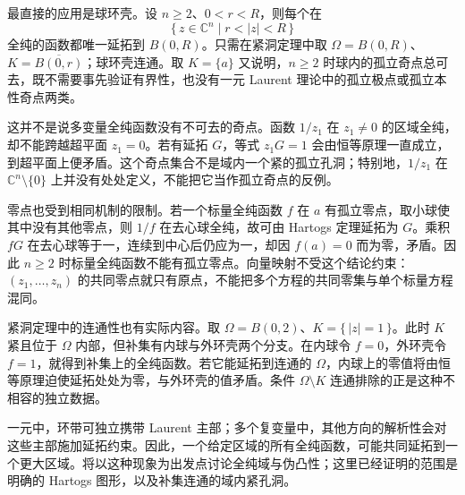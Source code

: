 最直接的应用是球环壳。设 \(n\ge2\)、\(0<r<R\)，则每个在
\[
 \{\,z\in\mathbb C^n\mid r<|z|<R\,\}
\]
全纯的函数都唯一延拓到 \(B(0,R)\)。只需在紧洞定理中取 \(\Omega=B(0,R)\)、\(K=\overline{B(0,r)}\)；球环壳连通。取 \(K=\{a\}\) 又说明，\(n\ge2\) 时球内的孤立奇点总可去，既不需要事先验证有界性，也没有一元 Laurent 理论中的孤立极点或孤立本性奇点两类。

\ProseParagraphBreak
这并不是说多变量全纯函数没有不可去的奇点。函数 \(1/z_1\) 在 \(z_1\ne0\) 的区域全纯，却不能跨越超平面 \(z_1=0\)。若有延拓 \(G\)，等式 \(z_1G=1\) 会由恒等原理一直成立，到超平面上便矛盾。这个奇点集合不是域内一个紧的孤立孔洞；特别地，\(1/z_1\) 在 \(\mathbb C^n\setminus\{0\}\) 上并没有处处定义，不能把它当作孤立奇点的反例。

\ProseParagraphBreak
零点也受到相同机制的限制。若一个标量全纯函数 \(f\) 在 \(a\) 有孤立零点，取小球使其中没有其他零点，则 \(1/f\) 在去心球全纯，故可由 Hartogs 定理延拓为 \(G\)。乘积 \(fG\) 在去心球等于一，连续到中心后仍应为一，却因 \(f(a)=0\) 而为零，矛盾。因此 \(n\ge2\) 时标量全纯函数不能有孤立零点。向量映射不受这个结论约束：\((z_1,\ldots,z_n)\) 的共同零点就只有原点，不能把多个方程的共同零集与单个标量方程混同。

\ProseParagraphBreak
紧洞定理中的连通性也有实际内容。取 \(\Omega=B(0,2)\)、\(K=\{\,|z|=1\,\}\)。此时 \(K\) 紧且位于 \(\Omega\) 内部，但补集有内球与外环壳两个分支。在内球令 \(f=0\)，外环壳令 \(f=1\)，就得到补集上的全纯函数。若它能延拓到连通的 \(\Omega\)，内球上的零值将由恒等原理迫使延拓处处为零，与外环壳的值矛盾。条件 \(\Omega\setminus K\) 连通排除的正是这种不相容的独立数据。

\ProseParagraphBreak
一元中，环带可独立携带 Laurent 主部；多个复变量中，其他方向的解析性会对这些主部施加延拓约束。因此，一个给定区域的所有全纯函数，可能共同延拓到一个更大区域。将以这种现象为出发点讨论全纯域与伪凸性；这里已经证明的范围是明确的 Hartogs 图形，以及补集连通的域内紧孔洞。
